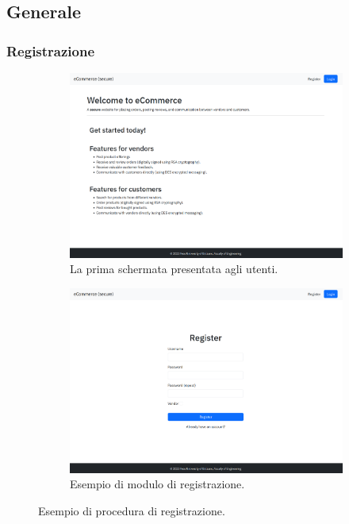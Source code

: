 \documentclass[conference,onecolumn,a4paper]{IEEEtran}
\begin{document}
\subsection{Generale}

\subsubsection{Registrazione}

\begin{figure}[H]
    \centering
    \begin{subfigure}[b]{0.4\linewidth}
        \includegraphics[width=\linewidth]{resources/welcome.png}
        \caption{La prima schermata presentata agli utenti.}
    \end{subfigure}
    \begin{subfigure}[b]{0.4\linewidth}
        \includegraphics[width=\linewidth]{resources/register.png}
        \caption{Esempio di modulo di registrazione.}
    \end{subfigure}
    \caption{Esempio di procedura di registrazione.}
\end{figure}
\end{document}
